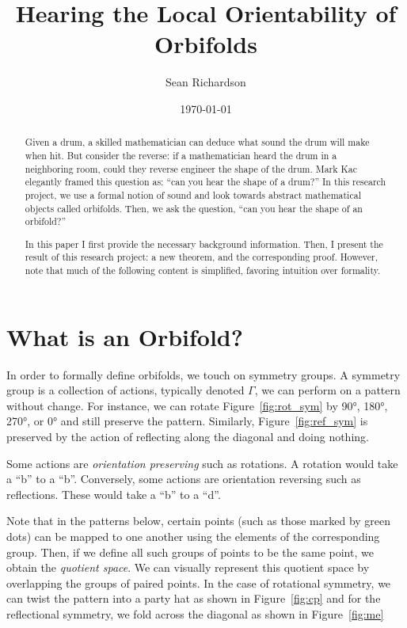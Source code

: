 \documentclass{article}[12pt]
\theoremstyle{definition}
\begin{document}
\singlespacing
\title{Hearing the Local Orientability of Orbifolds}
\author{Sean Richardson}
\date{\today}
\maketitle

\begin{abstract}
    Given a drum, a skilled mathematician can deduce what sound the drum
    will make when hit. But consider the reverse: if a mathematician heard
    the drum in a neighboring room, could they reverse engineer the shape
    of the drum.  Mark Kac elegantly framed this question as: ``can you
    hear the shape of a drum?'' In this research project, we use a formal
    notion of sound and look towards abstract mathematical objects called
    orbifolds.  Then, we ask the question, ``can you hear the shape of an
    orbifold?''

    In this paper I first provide the necessary background information.
    Then, I present the result of this research project: a new theorem, and
    the corresponding proof. However, note that much of the following
    content is simplified, favoring intuition over formality.

\end{abstract}

\section{What is an Orbifold?}
\indent In order to formally define orbifolds, we touch on symmetry groups. A
symmetry group is a collection of actions, typically denoted $\Gamma$, we
can perform on a pattern without change. For instance, we can rotate
Figure~\ref{fig:rot_sym} by \ang{90}, \ang{180}, \ang{270}, or \ang{0} and
still preserve the pattern. Similarly, Figure~\ref{fig:ref_sym} is
preserved by the action of reflecting along the diagonal and doing nothing.

Some actions are \emph{orientation preserving} such as rotations. A
rotation would take a ``b'' to a ``b''. Conversely, some actions are
orientation reversing such as reflections. These would take a ``b'' to a
``d''.

Note that in the patterns below, certain points (such as those marked by
green dots) can be mapped to one another using the elements of the
corresponding group. Then, if we define all such groups of points to be the
same point, we obtain the \emph{quotient space}. We can visually represent
this quotient space by overlapping the groups of paired points. In the case
of rotational symmetry, we can twist the pattern into a party hat as shown
in Figure~\ref{fig:cp} and for the reflectional symmetry, we fold across
the diagonal as shown in Figure~\ref{fig:me}
\end{document}
